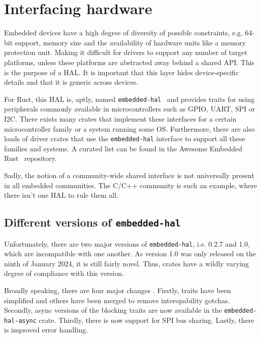 \section{Interfacing hardware}
\label{sec:hardware}

Embedded devices have a high degree of diversity of possible constraints, e.g. 64-bit support, memory size and the availability of hardware units like a memory protection unit. Making it difficult for drivers to support any number of target platforms, unless these platforms are abstracted away behind a shared API. This is the purpose of a \gls{HAL}. It is important that this layer hides device-specific details and that it is generic across devices. 

For Rust, this \gls{HAL} is, aptly, named \texttt{embedded-hal}~\cite{gh:eh} and provides traits for using peripherals commonly available in microcontrollers such as \gls{GPIO}, \gls{UART}, \gls{SPI} or \gls{I2C}. There exists many crates that implement these interfaces for a certain microcontroller family or a system running some \gls{OS}. Furthermore, there are also loads of driver crates that use the \texttt{embedded-hal} interface to support all these families and systems. A curated list can be found in the Awesome Embedded Rust~\cite{gh:aer} repository.

Sadly, the notion of a community-wide shared interface is not universally present in all embedded communities. The C/C++ community is such an example, where there isn't one \gls{HAL} to rule them all.

\subsection{Different versions of \texttt{embedded-hal}}

Unfortunately, there are two major versions of \texttt{embedded-hal}, i.e. 0.2.7 and 1.0, which are incompatible with one another. 
As version 1.0 was only released on the ninth of January 2024, it is still fairly novel. Thus, crates have a wildly varying degree of compliance with this version. 

Broadly speaking, there are four major changes \cite{hal:1}. Firstly, traits have been simplified and others have been merged to remove interopability gotchas. 
Secondly, async versions of the blocking traits are now available in the \texttt{embedded-hal-async} crate. Thirdly, there is now support for \gls{SPI} bus sharing. Lastly, there is improved error handling.


